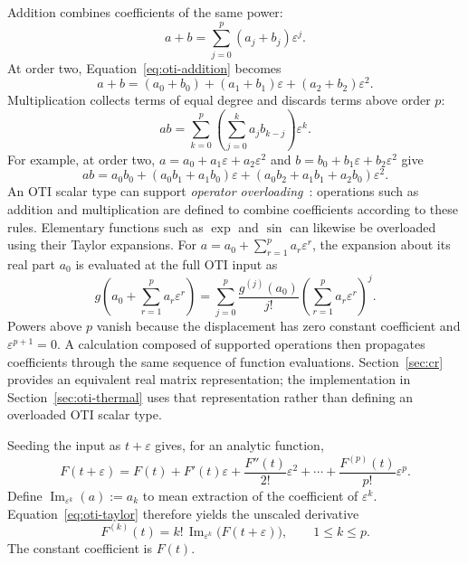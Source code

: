 \documentclass[10pt]{article}
\begin{document}
Addition combines coefficients of the same power:
\begin{equation}
\label{eq:oti-addition}
 a+b=\sum_{j=0}^{p}(a_j+b_j)\varepsilon^j.
\end{equation}
At order two, Equation~\eqref{eq:oti-addition} becomes
\[
 a+b=(a_0+b_0)+(a_1+b_1)\varepsilon+(a_2+b_2)\varepsilon^2.
\]
Multiplication collects terms
of equal degree and discards terms above order $p$:
\[
 ab=\sum_{k=0}^{p}\left(\sum_{j=0}^{k}a_jb_{k-j}\right)\varepsilon^k.
\]
For example, at order two, $a=a_0+a_1\varepsilon+a_2\varepsilon^2$ and
$b=b_0+b_1\varepsilon+b_2\varepsilon^2$ give
\[
 ab=a_0b_0+(a_0b_1+a_1b_0)\varepsilon
 +(a_0b_2+a_1b_1+a_2b_0)\varepsilon^2.
\]
An OTI scalar type can support \emph{operator overloading}~\cite{phipps2012efficient}: operations such as
addition and multiplication are defined to combine coefficients according
to these rules. Elementary functions such as $\exp$ and $\sin$ can likewise be
overloaded using their Taylor expansions. For
$a=a_0+\sum_{r=1}^{p}a_r\varepsilon^r$, the expansion about its real part $a_0$
is evaluated at the full OTI input as
\begin{equation}
\label{eq:oti-function}
 g\!\left(a_0+\sum_{r=1}^{p}a_r\varepsilon^r\right)
 =\sum_{j=0}^{p}\frac{g^{(j)}(a_0)}{j!}
     \left(\sum_{r=1}^{p}a_r\varepsilon^r\right)^j.
\end{equation}
Powers above $p$ vanish because the displacement has zero constant coefficient
and $\varepsilon^{p+1}=0$. A calculation composed of supported operations then propagates coefficients
through the same sequence of function evaluations. Section~\ref{sec:cr}
provides an equivalent real matrix representation; the implementation in
Section~\ref{sec:oti-thermal} uses that representation rather than defining
an overloaded OTI scalar type.

Seeding the input as $t+\varepsilon$ gives, for an analytic function,
\begin{equation}
\label{eq:oti-taylor}
 F(t+\varepsilon)=F(t)+F'(t)\varepsilon+
 \frac{F''(t)}{2!}\varepsilon^2+\cdots+
 \frac{F^{(p)}(t)}{p!}\varepsilon^p.
\end{equation}
Define $\operatorname{Im}_{\varepsilon^k}(a):=a_k$ to mean extraction of the
coefficient of $\varepsilon^k$. Equation~\eqref{eq:oti-taylor} therefore yields the unscaled derivative
\begin{equation}
\label{eq:oti-extraction}
 \boxed{F^{(k)}(t)=k!\,\operatorname{Im}_{\varepsilon^k}
       \bigl(F(t+\varepsilon)\bigr)},\qquad 1\leq k\leq p.
\end{equation}
The constant coefficient is $F(t)$.
\end{document}

